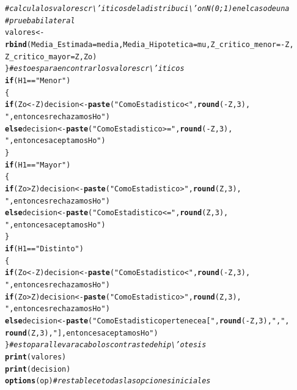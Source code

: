 \documentclass[12pt,letterpaper]{article}\usepackage[]{graphicx}\usepackage[]{color}
\makeatletter
\newcommand{\hlnum}[1]{\textcolor[rgb]{0.686,0.059,0.569}{#1}}%
\newcommand{\hlstr}[1]{\textcolor[rgb]{0.192,0.494,0.8}{#1}}%
\newcommand{\hlcom}[1]{\textcolor[rgb]{0.678,0.584,0.686}{\textit{#1}}}%
\newcommand{\hlopt}[1]{\textcolor[rgb]{0,0,0}{#1}}%
\newcommand{\hlstd}[1]{\textcolor[rgb]{0.345,0.345,0.345}{#1}}%
\newcommand{\hlkwa}[1]{\textcolor[rgb]{0.161,0.373,0.58}{\textbf{#1}}}%
\newcommand{\hlkwb}[1]{\textcolor[rgb]{0.69,0.353,0.396}{#1}}%
\newcommand{\hlkwc}[1]{\textcolor[rgb]{0.333,0.667,0.333}{#1}}%
\newcommand{\hlkwd}[1]{\textcolor[rgb]{0.737,0.353,0.396}{\textbf{#1}}}%
\newenvironment{kframe}{%
 \def\at@end@of@kframe{}%
 \ifinner\ifhmode%
  \def\at@end@of@kframe{\end{minipage}}%
  \begin{minipage}{\columnwidth}%
 \fi\fi%
 \def\FrameCommand##1{\hskip\@totalleftmargin \hskip-\fboxsep
 \colorbox{shadecolor}{##1}\hskip-\fboxsep
     \hskip-\linewidth \hskip-\@totalleftmargin \hskip\columnwidth}%
 \MakeFramed {\advance\hsize-\width
   \@totalleftmargin\z@ \linewidth\hsize
   \@setminipage}}%
 {\par\unskip\endMakeFramed%
 \at@end@of@kframe}
\newenvironment{knitrout}{}{} %
\makeatother
\begin{document}
\begin{knitrout}
\begin{kframe}
\begin{alltt}
\hlcom{# calcula los valores cr\textbackslash{}'iticos de la distribuci\textbackslash{}'on N(0;1) en el caso de una }
\hlcom{# prueba  bilateral }
\hlstd{valores} \hlkwb{<-} \hlkwd{rbind}\hlstd{(}\hlkwc{Media_Estimada}\hlstd{=media,} \hlkwc{Media_Hipotetica}\hlstd{=mu,} \hlkwc{Z_critico_menor}\hlstd{=}\hlopt{-}\hlstd{Z,}
\hlkwc{Z_critico_mayor} \hlstd{=Z, Zo)}
\hlstd{\}} \hlcom{# esto es para encontrar los valores cr\textbackslash{}'iticos }
\hlkwa{if} \hlstd{(H1} \hlopt{==} \hlstr{"Menor"}\hlstd{)}
\hlstd{\{}
 \hlkwa{if} \hlstd{(Zo} \hlopt{< -}\hlstd{Z) decision} \hlkwb{<-} \hlkwd{paste}\hlstd{(}\hlstr{"Como Estadistico <"}\hlstd{,} \hlkwd{round}\hlstd{(}\hlopt{-}\hlstd{Z,}\hlnum{3}\hlstd{),}
                                \hlstr{", entonces rechazamos Ho"}\hlstd{)}
 \hlkwa{else} \hlstd{decision} \hlkwb{<-} \hlkwd{paste}\hlstd{(}\hlstr{"Como Estadistico>="}\hlstd{,} \hlkwd{round}\hlstd{(}\hlopt{-}\hlstd{Z,}\hlnum{3}\hlstd{),}
                        \hlstr{", entonces aceptamos Ho"}\hlstd{)}
\hlstd{\}}
\hlkwa{if} \hlstd{(H1} \hlopt{==} \hlstr{"Mayor"}\hlstd{)}
\hlstd{\{}
\hlkwa{if} \hlstd{(Zo} \hlopt{>} \hlstd{Z) decision} \hlkwb{<-} \hlkwd{paste}\hlstd{(}\hlstr{"Como Estadistico >"}\hlstd{,} \hlkwd{round}\hlstd{(Z,}\hlnum{3}\hlstd{),}
                              \hlstr{", entonces rechazamos Ho"}\hlstd{)}
\hlkwa{else} \hlstd{decision} \hlkwb{<-} \hlkwd{paste}\hlstd{(}\hlstr{"Como Estadistico <="}\hlstd{,} \hlkwd{round}\hlstd{(Z,}\hlnum{3}\hlstd{),}
                       \hlstr{", entonces aceptamos Ho"}\hlstd{)}
\hlstd{\}}
\hlkwa{if} \hlstd{(H1} \hlopt{==} \hlstr{"Distinto"}\hlstd{)}
\hlstd{\{}
 \hlkwa{if} \hlstd{(Zo} \hlopt{< -}\hlstd{Z) decision} \hlkwb{<-} \hlkwd{paste}\hlstd{(}\hlstr{"Como Estadistico <"}\hlstd{,} \hlkwd{round}\hlstd{(}\hlopt{-}\hlstd{Z,}\hlnum{3}\hlstd{),}
                                \hlstr{", entonces rechazamos Ho"}\hlstd{)}
 \hlkwa{if} \hlstd{(Zo} \hlopt{>} \hlstd{Z) decision} \hlkwb{<-} \hlkwd{paste}\hlstd{(}\hlstr{"Como Estadistico >"}\hlstd{,} \hlkwd{round}\hlstd{(Z,}\hlnum{3}\hlstd{),}
                               \hlstr{", entonces rechazamos Ho"}\hlstd{)}
 \hlkwa{else} \hlstd{decision} \hlkwb{<-} \hlkwd{paste}\hlstd{(}\hlstr{"Como Estadistico pertenece a ["}\hlstd{,} \hlkwd{round}\hlstd{(}\hlopt{-}\hlstd{Z,}\hlnum{3}\hlstd{),} \hlstr{","}\hlstd{,}
\hlkwd{round}\hlstd{(Z,}\hlnum{3}\hlstd{),} \hlstr{"], entonces aceptamos Ho"}\hlstd{)}
\hlstd{\}} \hlcom{# esto para llevar a cabo los contraste de hip\textbackslash{}'otesis }
\hlkwd{print}\hlstd{(valores)}
\hlkwd{print}\hlstd{(decision)}
\hlkwd{options}\hlstd{(op)} \hlcom{# restablece todas las opciones iniciales }

\end{alltt}
\end{kframe}
\end{knitrout}
\end{document}
